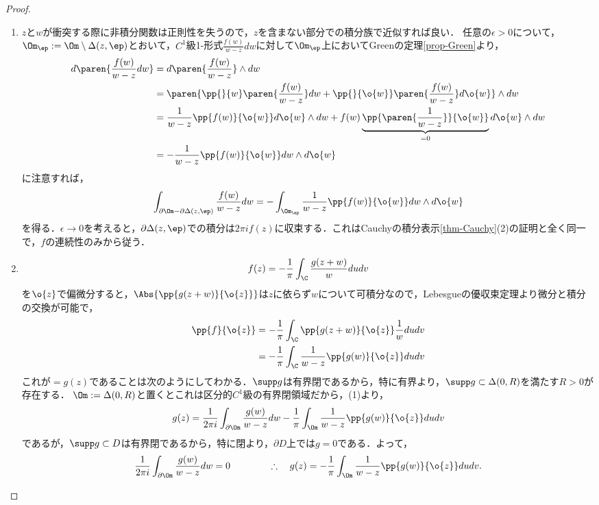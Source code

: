 \documentclass[uplatex, dvipdfmx]{jsreport}
\begin{document}
\begin{proof}\mbox{}
    \begin{enumerate}
        \item $z$と$w$が衝突する際に非積分関数は正則性を失うので，$z$を含まない部分での積分族で近似すれば良い．
        任意の$\epsilon>0$について，$\Om_\ep:=\Om\setminus\Delta(z,\ep)$とおいて，$C^1$級1-形式$\frac{f(w)}{w-z}dw$に対して$\Om_\ep$上においてGreenの定理\ref{prop-Green}より，
        \begin{align*}
            d\paren{\frac{f(w)}{w-z}dw}&=d\paren{\frac{f(w)}{w-z}}\wedge dw\\
            &=\paren{\pp{}{w}\paren{\frac{f(w)}{w-z}}dw+\pp{}{\o{w}}\paren{\frac{f(w)}{w-z}}d\o{w}}\wedge dw\\
            &=\frac{1}{w-z}\pp{f(w)}{\o{w}}d\o{w}\wedge dw+f(w)\underbrace{\pp{\paren{\frac{1}{w-z}}}{\o{w}}}_{=0}d\o{w}\wedge dw\\
            &=-\frac{1}{w-z}\pp{f(w)}{\o{w}}dw\wedge d\o{w}
        \end{align*}
        に注意すれば，
        \[\int_{\partial\Om-\partial\Delta(z,\ep)}\frac{f(w)}{w-z}dw=-\int_{\Om_\ep}\frac{1}{w-z}\pp{f(w)}{\o{w}}dw\wedge d\o{w}\]
        を得る．$\epsilon\to0$を考えると，$\partial\Delta(z,\ep)$での積分は$2\pi if(z)$に収束する．これはCauchyの積分表示\ref{thm-Cauchy}(2)の証明と全く同一で，$f$の連続性のみから従う．
        \item 
        \[f(z)=-\frac{1}{\pi}\int_\C\frac{g(z+w)}{w}dudv\]
        を$\o{z}$で偏微分すると，$\Abs{\pp{g(z+w)}{\o{z}}}$は$z$に依らず$w$について可積分なので，Lebesgueの優収束定理より微分と積分の交換が可能で，
        \begin{align*}
            \pp{f}{\o{z}}&=-\frac{1}{\pi}\int_\C\pp{g(z+w)}{\o{z}}\frac{1}{w}dudv\\
            &=-\frac{1}{\pi}\int_\C\frac{1}{w-z}\pp{g(w)}{\o{z}}dudv
        \end{align*}
        これが$=g(z)$であることは次のようにしてわかる．$\supp g$は有界閉であるから，特に有界より，$\supp g\subset\Delta(0,R)$を満たす$R>0$が存在する．
        $\Om:=\Delta(0,R)$と置くとこれは区分的$C^1$級の有界閉領域だから，(1)より，
        \[g(z)=\frac{1}{2\pi i}\int_{\partial\Om}\frac{g(w)}{w-z}dw-\frac{1}{\pi}\int_\Om\frac{1}{w-z}\pp{g(w)}{\o{z}}dudv\]
        であるが，$\supp g\subset D$は有界閉であるから，特に閉より，$\partial D$上では$g=0$である．よって，
        \[\frac{1}{2\pi i}\int_{\partial\Om}\frac{g(w)}{w-z}dw=0\qquad\qquad\therefore\quad g(z)=-\frac{1}{\pi}\int_\Om\frac{1}{w-z}\pp{g(w)}{\o{z}}dudv.\]
    \end{enumerate}
\end{proof}
\end{document}
